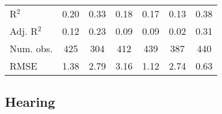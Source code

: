 \documentclass[fullpage]{paper}
\begin{document}
\begin{center}
\begin{longtable}{l c c c c c c }
\hline
R$^2$       & 0.20          & 0.33          & 0.18          & 0.17          & 0.13          & 0.38          \\
Adj. R$^2$  & 0.12          & 0.23          & 0.09          & 0.09          & 0.02          & 0.31          \\
Num. obs.   & 425           & 304           & 412           & 439           & 387           & 440           \\
RMSE        & 1.38          & 2.79          & 3.16          & 1.12          & 2.74          & 0.63          \\
\end{longtable}
\end{center}
\subsection{ Hearing }
\end{document}
